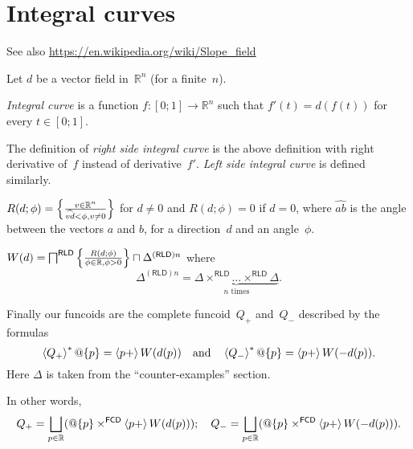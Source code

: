 \section{Integral curves}


See also \url{https://en.wikipedia.org/wiki/Slope_field}

Let $d$ be a vector field in~$\mathbb{R}^n$ (for a finite~$n$).


\begin{defn}
\emph{Integral curve} is a function $f:[0;1]\rightarrow\mathbb{R}^n$ such that $f'(t)=d(f(t))$ for every $t\in[0;1]$.
\end{defn}

\begin{defn}
The definition of \emph{right side integral curve} is the above definition with right derivative of~$f$ instead of derivative~$f'$.
\emph{Left side integral curve} is defined similarly.
\end{defn}

$R(d;\phi) = \left\{ \frac{v\in\mathbb{R}^n}{\widehat{vd}<\phi, v\ne 0}\right\}$ for $d\ne 0$ and $R(d;\phi) = 0$ if $d=0$,
where $\widehat{ab}$ is the angle between the vectors $a$ and $b$,
for a direction~$d$ and an angle~$\phi$.

$W(d) = \bigsqcap^{\mathsf{RLD}}\left\{ \frac{R(d;\phi)}{\phi\in\mathbb{R},\phi>0}\right\} \sqcap \Delta^{(\mathsf{RLD})n}$
where \[ \Delta^{(\mathsf{RLD})n} = \underbrace{\Delta\times^{\mathsf{RLD}}\dots\times^{\mathsf{RLD}}\Delta}_{n\text{ times}}. \]

Finally our funcoids are the complete funcoid~$Q_+$ and~$Q_-$ described by the formulas
\[
\left\langle Q_+\right\rangle ^{\ast}@\{p\} = \left\langle p+\right\rangle W(d(p)) \quad\text{and}\quad \left\langle Q_-\right\rangle ^{\ast}@\{p\} = \left\langle p+\right\rangle W(-d(p)).
\]
Here $\Delta$ is taken from the ``counter-examples'' section.

In other words,
\[
Q_+ = \bigsqcup_{p\in\mathbb{R}} (@\{p\}\times^{\mathsf{FCD}}\supfun{p+}{W(d(p))});
\quad
Q_- = \bigsqcup_{p\in\mathbb{R}} (@\{p\}\times^{\mathsf{FCD}}\supfun{p+}{W(-d(p))}).
\]


